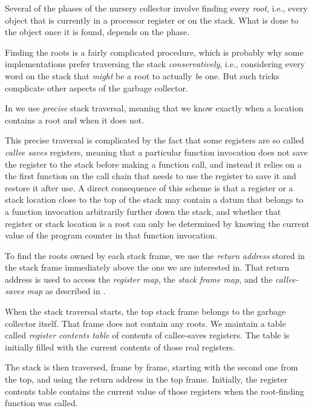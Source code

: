 Several of the phases of the nursery collector involve finding every
\emph{root}, i.e., every \commonlisp{} object that is currently in a
processor register or on the stack.  What is done to the object once
it is found, depends on the phase.

Finding the roots is a fairly complicated procedure, which is probably
why some implementations prefer traversing the stack
\emph{conservatively}, i.e., considering every word on the stack that
\emph{might} be a root to actually \emph{be} one.  But such tricks
complicate other aspects of the garbage collector.

In \sysname{} we use \emph{precise} stack traversal, meaning that we
know exactly when a location contains a root and when it does not.

This precise traversal is complicated by the fact that some registers
are so called \emph{callee saves} registers, meaning that a particular
function invocation does not save the register to the stack before
making a function call, and instead it relies on a the first function
on the call chain that needs to use the register to save it and
restore it after use.  A direct consequence of this scheme is that a
register or a stack location close to the top of the stack may contain
a datum that belongs to a function invocation arbitrarily further down
the stack, and whether that register or stack location is a root can
only be determined by knowing the current value of the program counter
in that function invocation.

To find the roots owned by each stack frame, we use the \emph{return
  address} stored in the stack frame immediately above the one we are
interested in.  That return address is used to access the
\emph{register map}, the \emph{stack frame map}, and the
\emph{callee-saves map} as described in
.

When the stack traversal starts, the top stack frame belongs to the
garbage collector itself.  That frame does not contain any roots.  We
maintain a table called \emph{register contents table} of contents of
callee-saves registers.  The table is initially filled with the
current contents of those real registers.

The stack is then traversed, frame by frame, starting with the second
one from the top, and using the return address in the top frame.
Initially, the register contents table contains the current value of
those registers when the root-finding function was called.

